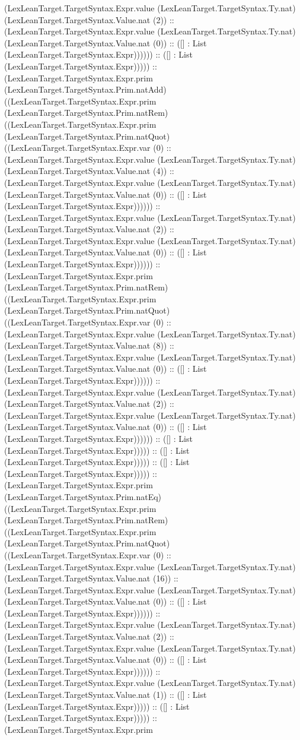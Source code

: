 \documentclass[11pt]{article}
\begin{document}
(LexLeanTarget.TargetSyntax.Expr.value (LexLeanTarget.TargetSyntax.Ty.nat) (LexLeanTarget.TargetSyntax.Value.nat (2)) :: (LexLeanTarget.TargetSyntax.Expr.value (LexLeanTarget.TargetSyntax.Ty.nat) (LexLeanTarget.TargetSyntax.Value.nat (0)) :: ([] : List (LexLeanTarget.TargetSyntax.Expr)))))) :: ([] : List (LexLeanTarget.TargetSyntax.Expr))))) :: (LexLeanTarget.TargetSyntax.Expr.prim (LexLeanTarget.TargetSyntax.Prim.natAdd) ((LexLeanTarget.TargetSyntax.Expr.prim (LexLeanTarget.TargetSyntax.Prim.natRem) ((LexLeanTarget.TargetSyntax.Expr.prim (LexLeanTarget.TargetSyntax.Prim.natQuot) ((LexLeanTarget.TargetSyntax.Expr.var (0) :: (LexLeanTarget.TargetSyntax.Expr.value (LexLeanTarget.TargetSyntax.Ty.nat) (LexLeanTarget.TargetSyntax.Value.nat (4)) :: (LexLeanTarget.TargetSyntax.Expr.value (LexLeanTarget.TargetSyntax.Ty.nat) (LexLeanTarget.TargetSyntax.Value.nat (0)) :: ([] : List (LexLeanTarget.TargetSyntax.Expr)))))) :: (LexLeanTarget.TargetSyntax.Expr.value (LexLeanTarget.TargetSyntax.Ty.nat) (LexLeanTarget.TargetSyntax.Value.nat (2)) :: (LexLeanTarget.TargetSyntax.Expr.value (LexLeanTarget.TargetSyntax.Ty.nat) (LexLeanTarget.TargetSyntax.Value.nat (0)) :: ([] : List (LexLeanTarget.TargetSyntax.Expr)))))) :: (LexLeanTarget.TargetSyntax.Expr.prim (LexLeanTarget.TargetSyntax.Prim.natRem) ((LexLeanTarget.TargetSyntax.Expr.prim (LexLeanTarget.TargetSyntax.Prim.natQuot) ((LexLeanTarget.TargetSyntax.Expr.var (0) :: (LexLeanTarget.TargetSyntax.Expr.value (LexLeanTarget.TargetSyntax.Ty.nat) (LexLeanTarget.TargetSyntax.Value.nat (8)) :: (LexLeanTarget.TargetSyntax.Expr.value (LexLeanTarget.TargetSyntax.Ty.nat) (LexLeanTarget.TargetSyntax.Value.nat (0)) :: ([] : List (LexLeanTarget.TargetSyntax.Expr)))))) :: (LexLeanTarget.TargetSyntax.Expr.value (LexLeanTarget.TargetSyntax.Ty.nat) (LexLeanTarget.TargetSyntax.Value.nat (2)) :: (LexLeanTarget.TargetSyntax.Expr.value (LexLeanTarget.TargetSyntax.Ty.nat) (LexLeanTarget.TargetSyntax.Value.nat (0)) :: ([] : List (LexLeanTarget.TargetSyntax.Expr)))))) :: ([] : List (LexLeanTarget.TargetSyntax.Expr))))) :: ([] : List (LexLeanTarget.TargetSyntax.Expr))))) :: ([] : List (LexLeanTarget.TargetSyntax.Expr))))) :: (LexLeanTarget.TargetSyntax.Expr.prim (LexLeanTarget.TargetSyntax.Prim.natEq) ((LexLeanTarget.TargetSyntax.Expr.prim (LexLeanTarget.TargetSyntax.Prim.natRem) ((LexLeanTarget.TargetSyntax.Expr.prim (LexLeanTarget.TargetSyntax.Prim.natQuot) ((LexLeanTarget.TargetSyntax.Expr.var (0) :: (LexLeanTarget.TargetSyntax.Expr.value (LexLeanTarget.TargetSyntax.Ty.nat) (LexLeanTarget.TargetSyntax.Value.nat (16)) :: (LexLeanTarget.TargetSyntax.Expr.value (LexLeanTarget.TargetSyntax.Ty.nat) (LexLeanTarget.TargetSyntax.Value.nat (0)) :: ([] : List (LexLeanTarget.TargetSyntax.Expr)))))) :: (LexLeanTarget.TargetSyntax.Expr.value (LexLeanTarget.TargetSyntax.Ty.nat) (LexLeanTarget.TargetSyntax.Value.nat (2)) :: (LexLeanTarget.TargetSyntax.Expr.value (LexLeanTarget.TargetSyntax.Ty.nat) (LexLeanTarget.TargetSyntax.Value.nat (0)) :: ([] : List (LexLeanTarget.TargetSyntax.Expr)))))) :: (LexLeanTarget.TargetSyntax.Expr.value (LexLeanTarget.TargetSyntax.Ty.nat) (LexLeanTarget.TargetSyntax.Value.nat (1)) :: ([] : List (LexLeanTarget.TargetSyntax.Expr))))) :: ([] : List (LexLeanTarget.TargetSyntax.Expr))))) :: (LexLeanTarget.TargetSyntax.Expr.prim 
\end{document}
